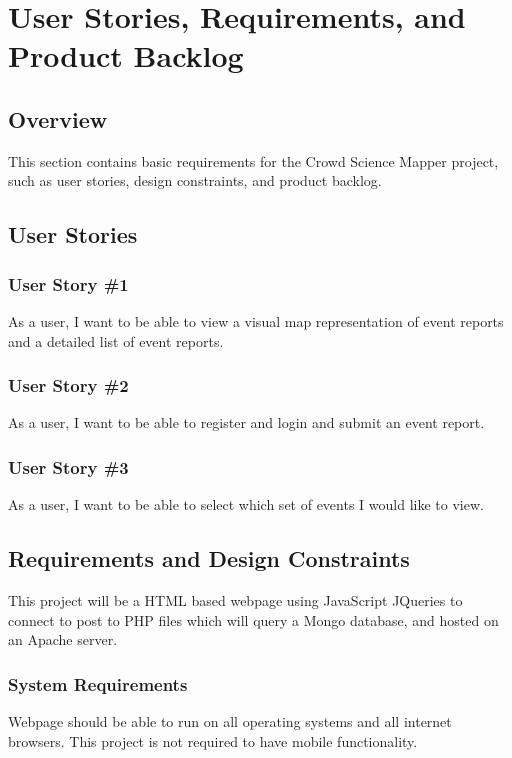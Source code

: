 
\chapter{User Stories,  Requirements, and Product Backlog}
\section{Overview}

This section contains basic requirements for the Crowd Science Mapper project, such as user stories, design constraints, and product backlog. 

\section{User Stories}

\subsection{User Story \#1}
As a user, I want to be able to view a visual map representation of event reports and a detailed list of event reports.

\subsection{User Story \#2} 
As a user, I want to be able to register and login and submit an event report.

\subsection{User Story \#3} 
As a user, I want to be able to select which set of events I would like to view.

\section{Requirements and Design Constraints}
This project will be a HTML based webpage using JavaScript JQueries to connect to post to PHP files which will query a Mongo database, and hosted on an Apache server.

\subsection{System  Requirements}
Webpage should be able to run on all operating systems and all internet browsers. This project is not required to have mobile functionality. 

